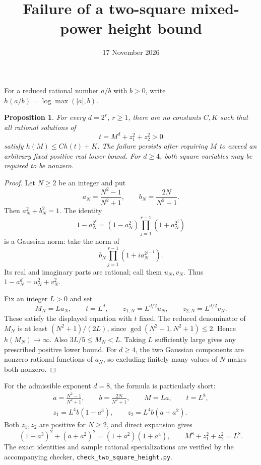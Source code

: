 \documentclass[11pt,a4paper]{article}
\title{Failure of a two-square mixed-power height bound}
\author{}\date{17 November 2026}
\newtheorem{proposition}{Proposition}
\begin{document}
\maketitle

For a reduced rational number $a/b$ with $b>0$, write
$h(a/b)=\log\max(|a|,b)$.

\begin{proposition}\label{prop:failure}
For every $d=2^r$, $r\ge1$, there are no constants $C,K$ such
that all rational solutions of
\[
                         t=M^d+z_1^2+z_2^2>0
\]
satisfy $h(M)\le C h(t)+K$. The failure persists after requiring
$M$ to exceed an arbitrary fixed positive real lower bound.
For $d\ge4$, both square variables may be required to be nonzero.
\end{proposition}
\begin{proof}
Let $N\ge2$ be an integer and put
\[
 a_N=\frac{N^2-1}{N^2+1},\qquad
 b_N=\frac{2N}{N^2+1}.
\]
Then $a_N^2+b_N^2=1$. The identity
\[
 1-a_N^{2^r}
  =(1-a_N^2)\prod_{j=1}^{r-1}(1+a_N^{2^j})
\]
is a Gaussian norm: take the norm of
\[
 b_N\prod_{j=1}^{r-1}(1+i a_N^{2^{j-1}}).
\]
Its real and imaginary parts are rational; call them $u_N,v_N$.
Thus $1-a_N^d=u_N^2+v_N^2$.

Fix an integer $L>0$ and set
\[
 M_N=L a_N,\qquad t=L^d,\qquad
 z_{1,N}=L^{d/2}u_N,\qquad z_{2,N}=L^{d/2}v_N.
\]
These satisfy the displayed equation with $t$ fixed. The reduced
denominator of $M_N$ is at least $(N^2+1)/(2L)$, since
$\gcd(N^2-1,N^2+1)\le2$. Hence $h(M_N)\to\infty$.
Also $3L/5\le M_N<L$. Taking $L$ sufficiently large gives any
prescribed positive lower bound. For $d\ge4$, the two Gaussian
components are nonzero rational functions of $a_N$, so excluding
finitely many values of $N$ makes both nonzero.
\end{proof}

For the admissible exponent $d=8$, the formula is particularly short:
\begin{equation}\label{eq:eight}
 \begin{gathered}
 a=\frac{N^2-1}{N^2+1},\qquad b=\frac{2N}{N^2+1},\qquad
 M=La,\qquad t=L^8,\\
 z_1=L^4 b(1-a^3),\qquad z_2=L^4 b(a+a^2).
 \end{gathered}
\end{equation}
Both $z_1,z_2$ are positive for $N\ge2$, and direct expansion gives
\[
 (1-a^3)^2+(a+a^2)^2=(1+a^2)(1+a^4),
 \qquad M^8+z_1^2+z_2^2=L^8.
\]
The exact identities and sample rational specializations are verified
by the accompanying checker,
\nolinkurl{check_two_square_height.py}.
\end{document}
